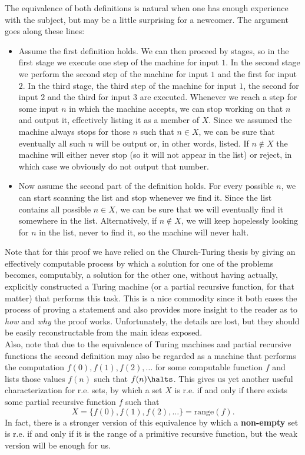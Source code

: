 \documentclass[../main.tex]{memoir}
\begin{document}
\begin{remark}
  \label{remark:re-equivalence}
  The equivalence of both definitions is natural when one has enough experience with the subject, but may be a little surprising for a newcomer. The argument goes along these lines:

  \begin{itemize}
  \item Assume the first definition holds. We can then proceed by stages, so in the first stage we execute one step of the machine for input $1$. In the second stage we perform the second step of the machine for input $1$ and the first for input $2$. In the third stage, the third step of the machine for input $1$, the second for input $2$ and the third for input $3$ are executed. Whenever we reach a step for some input $n$ in which the machine accepts, we can stop working on that $n$ and output it, effectively listing it as a member of $X$. Since we assumed the machine always stops for those $n$ such that $n \in X$, we can be sure that eventually all such $n$ will be output or, in other words, listed. If $n \not\in X$ the machine will either never stop (so it will not appear in the list) or reject, in which case we obviously do not output that number.
  \item Now assume the second part of the definition holds. For every possible $n$, we can start scanning the list and stop whenever we find it. Since the list contains all possible $n \in X$, we can be sure that we will eventually find it somewhere in the list. Alternatively, if $n \not\in X$, we will keep hopelessly looking for $n$ in the list, never to find it, so the machine will never halt.
  \end{itemize}

  Note that for this proof we have relied on the Church-Turing thesis by giving an effectively computable process by which a solution for one of the problems becomes, computably, a solution for the other one, without having actually, explicitly constructed a Turing machine (or a partial recursive function, for that matter) that performs this task. This is a nice commodity since it both eases the process of proving a statement and also provides more insight to the reader as to \textit{how} and \textit{why} the proof works. Unfortunately, the details are lost, but they should be easily reconstructable from the main ideas exposed. \\

  Also, note that due to the equivalence of Turing machines and partial recursive functions the second definition may also be regarded as a machine that performs the computation $f(0), f(1), f(2), \ldots$ for some computable function $f$ and lists those values $f(n)$ such that $f(n) \halts$. This gives us yet another useful characterization for r.e. sets, by which a set $X$ is r.e. if and only if there exists some partial recursive function $f$ such that
  \[ X = \{f(0), f(1), f(2), \ldots\} = \text{range}(f). \]
  In fact, there is a stronger version of this equivalence by which a \textbf{non-empty} set is r.e. if and only if it is the range of a primitive recursive function, but the weak version will be enough for us.
\end{remark}
\end{document}
